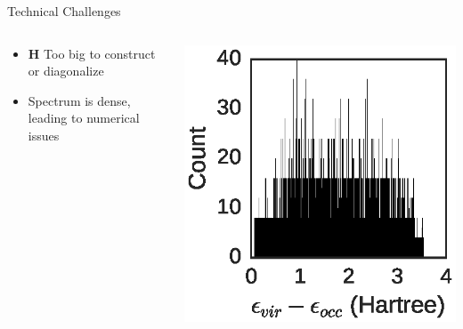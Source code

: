 \documentclass[10pt]{beamer}
\begin{document}
{{{{{{{{{{\begin{frame}{Technical Challenges}
	\begin{columns}[c] %
		\begin{column}{.4\textwidth}
			\begin{itemize}
			  \item {$\mathbf{H}$ Too big to construct or diagonalize}
				\item {Spectrum is dense, leading to numerical issues}
			\end{itemize}
		\end{column}
		\hfill
		\begin{column}{0.6\textwidth}
		    \begin{overprint}
			    \includegraphics[width=\linewidth]{../figures/exchist.eps}
			\end{overprint}
		\end{column}
	\end{columns}
\end{frame}

{%

}}}}}}}}}}}
\end{document}
